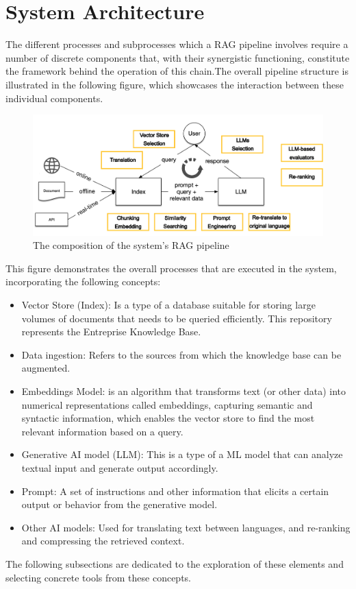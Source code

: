 \section{System Architecture}
The different processes and subprocesses which a RAG pipeline involves require a number of discrete components that, with their synergistic functioning, constitute the framework behind the operation of this chain.\newline The overall pipeline structure is illustrated in the following figure, which showcases the interaction between these individual components.\newline
\begin{figure}[H]
    \centering
    \includegraphics[width=\linewidth]{./figures/rag_components.png}
    \caption{The composition of the system's RAG pipeline}
\end{figure}
This figure demonstrates the overall processes that are executed in the system, incorporating the following concepts:
\begin{itemize}
    \item Vector Store (Index): Is a type of a database suitable for storing large volumes of documents that needs to be queried efficiently. This repository represents the Entreprise Knowledge Base.
    \item Data ingestion: Refers to the sources from which the knowledge base can be augmented.
    \item Embeddings Model: is an algorithm that transforms text (or other data) into numerical representations called embeddings, capturing semantic and syntactic information, which enables the vector store to find the most relevant information based on a query.
    \item Generative AI model (LLM): This is a type of a ML model that can analyze textual input and generate output accordingly.
    \item Prompt: A set of instructions and other information that elicits a certain output or behavior from the generative model.
    \item Other AI models: Used for translating text between languages, and re-ranking and compressing the retrieved context.
\end{itemize}
The following subsections are dedicated to the exploration of these elements and selecting concrete tools from these concepts.
